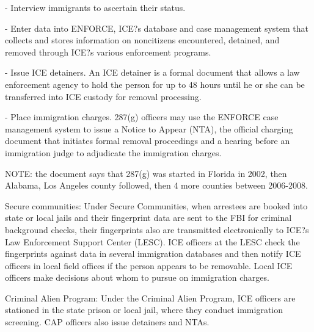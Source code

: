 - Interview immigrants to ascertain their status. 

- Enter data into ENFORCE, ICE?s database and case management system that collects and stores information on noncitizens encountered, detained, and removed through ICE?s various enforcement programs.

- Issue ICE detainers. An ICE detainer is a formal document that allows a law enforcement agency to hold the person for up to 48 hours until he or she can be transferred into ICE custody for removal processing. 

- Place immigration charges. 287(g) officers may use the ENFORCE case management system to issue a Notice to Appear (NTA), the official charging document that initiates formal removal proceedings and a hearing before an immigration judge to adjudicate the immigration charges. 

NOTE: the document says that 287(g) was started in Florida in 2002, then Alabama, Los Angeles county followed, then 4 more counties between 2006-2008.


Secure communities: Under Secure Communities, when arrestees are booked into state or local jails and their fingerprint data are sent to the FBI for criminal background checks, their fingerprints also are transmitted electronically to ICE?s Law Enforcement Support Center (LESC). ICE officers at the LESC check the fingerprints against data in several immigration databases and then notify ICE officers in local field offices if the person appears to be removable. Local ICE officers make decisions about whom to pursue on immigration charges.

Criminal Alien Program: Under the Criminal Alien Program, ICE officers are stationed in the state prison or local jail, where they conduct immigration screening. CAP officers also issue detainers and NTAs.

